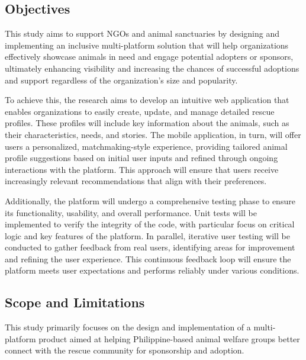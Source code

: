     \subsection{Objectives}
        This study aims to support NGOs and animal sanctuaries by designing and implementing an inclusive multi-platform solution that will help organizations effectively showcase animals in need and engage potential adopters or sponsors, ultimately enhancing visibility and increasing the chances of successful adoptions and support regardless of the organization's size and popularity.
        
        To achieve this, the research aims to develop an intuitive web application that enables organizations to easily create, update, and manage detailed rescue profiles. These profiles will include key information about the animals, such as their characteristics, needs, and stories. The mobile application, in turn, will offer users a personalized, matchmaking-style experience, providing tailored animal profile suggestions based on initial user inputs and refined through ongoing interactions with the platform. This approach will ensure that users receive increasingly relevant recommendations that align with their preferences.

        Additionally, the platform will undergo a comprehensive testing phase to ensure its functionality, usability, and overall performance. Unit tests will be implemented to verify the integrity of the code, with particular focus on critical logic and key features of the platform. In parallel, iterative user testing will be conducted to gather feedback from real users, identifying areas for improvement and refining the user experience. This continuous feedback loop will ensure the platform meets user expectations and performs reliably under various conditions.

        
    \subsection{Scope and Limitations}
        This study primarily focuses on the design and implementation of a multi-platform product aimed at helping Philippine-based animal welfare groups better connect with the rescue community for sponsorship and adoption.
